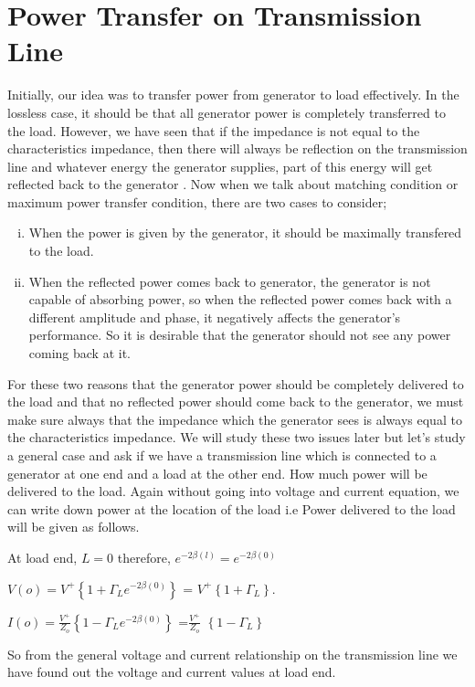 \section{Power Transfer on Transmission Line}
Initially, our idea was to transfer power from generator to load effectively. In the lossless case, it should be that all generator power is completely transferred to the load. However, we have seen that if the impedance is not equal to the characteristics impedance, then there will always be reflection on the transmission line and whatever energy the generator supplies, part of this energy will get reflected back to the generator . Now when we talk about matching condition or maximum power transfer condition, there are two cases to consider;
\begin{enumerate}[(i)]
\item When the power is given by the generator, it should be maximally transfered to the load.
\item When the reflected power comes back to generator, the generator is not capable of absorbing power, so when the reflected power comes back with a different amplitude and phase, it negatively affects the generator's performance. So it is desirable that the generator should not see any power coming back at it.
\end{enumerate}
For these two reasons that the generator power should be completely delivered to the load and that no reflected power should come back to the generator, we must make sure always that the impedance which the generator sees is always equal to the characteristics impedance. We will study these two issues later but let's study a general case and ask if we have a transmission line which is connected to a generator at  one end and a load at the other end. How much power will be delivered to the load. Again without going into voltage and current equation, we can write down power at the location of the load i.e Power delivered to the load will be given as follows.

At load end, $L=0$ therefore, $e^{-2\beta (l)} = e^{-2\beta (0)}$

$V(o)= V^{+} \left\lbrace {1 + \Gamma_L e^{-2\beta(0)}}\right\rbrace $ = $V^{+}\left\lbrace 1 +\Gamma_L \right\rbrace$.

$I(o)= \frac{V^{+}}{Z_o} \left\lbrace {1 - \Gamma_L e^{-2\beta(0)}}\right\rbrace $ =$ \frac{V^{+}}{Z_o}$ $\left\lbrace 1 -\Gamma_L \right\rbrace$ 

So from the general voltage and current relationship on the transmission line we have found  out the voltage and current values at load end.

